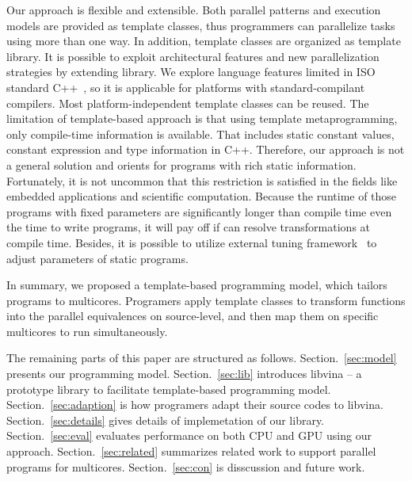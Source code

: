 Our approach is flexible and extensible. Both parallel patterns and
execution models are provided as template classes, thus programmers can
parallelize tasks using more than one way. In addition, template
classes are organized as template library. It is
possible to exploit architectural
features and new parallelization strategies by extending library. We
explore language features limited in ISO
standard C++~\cite{c++98, c++03, c++0x}, so it is applicable for
platforms with standard-compilant compilers. Most 
platform-independent template classes can be reused. The limitation of
template-based approach is that using template metaprogramming, only compile-time
information is available. That includes static constant values,
constant expression and type information in C++. Therefore, our
approach is not a general solution and orients for programs with rich
static information. Fortunately, it is not uncommon that this
restriction is satisfied in the fields like embedded applications and
scientific computation. Because the runtime of those programs with fixed
parameters are significantly longer than compile time even the time to
write programs, it will pay off if can resolve transformations at
compile time. Besides, it is possible to utilize external
tuning framework~\cite{tuningfrm} to adjust parameters of static programs.

In summary, we proposed a template-based programming model, which 
tailors programs to multicores. Programers apply template classes to
transform functions into the parallel equivalences on source-level,
and then map them on specific multicores to run simultaneously.

The remaining parts of this paper are structured as follows.
Section.~\ref{sec:model} presents our programming model. Section.~\ref{sec:lib} introduces libvina
-- a prototype library to facilitate template-based programming model.
Section.~\ref{sec:adaption} is how programers adapt their source codes to libvina. Section.~\ref{sec:details} gives details of
implemetation of our library. Section.~\ref{sec:eval}
evaluates performance on both CPU and GPU using our approach.
Section.~\ref{sec:related} summarizes related work to support parallel programs
for multicores. Section.~\ref{sec:con} is disscussion and future work.

